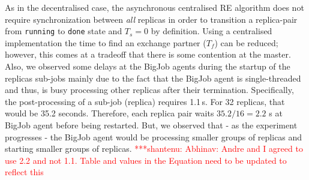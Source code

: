 \documentclass{rspublic}
\newcommand{\jhanote}[1]{ {\textcolor{red} { ***shantenu: #1 }}}
\newcommand{\alnote}[1]{ {\textcolor{blue} { ***andre: #1 }}}
\newcommand{\athotanote}[1]{ {\textcolor{green} { ***athota: #1 }}}
\newcommand{\alnote}[1]{}
\newcommand{\athotanote}[1]{}
\newcommand{\jhanote}[1]{}
\begin{document}




As in the decentralised case, the asynchronous centralised RE
algorithm does not require synchronization between {\it all} replicas
in order to transition a replica-pair from \texttt{running} to
\texttt{done} state and $T_s = 0$ by definition. Using a centralised
implementation the time to find an exchange partner ($T_f$) can be
reduced; however, this comes at a tradeoff that there is some
contention at the master. Also, we observed some delays at the BigJob
agents during the startup of the replicas sub-jobs mainly due to the
fact that the BigJob agent is single-threaded and thus, is busy
processing other replicas after their termination.  Specifically, the
post-processing of a sub-job (replica) requires
1.1\,s.%
For 32 replicas, that would be 35.2 seconds. Therefore, each replica
pair waits $35.2/16=2.2$ s at BigJob agent before being
restarted. But, we observed that - as the experiment progresses - the
BigJob agent would be processing smaller groups of replicas and
starting smaller groups of replicas. \jhanote{Abhinav: Andre and I
  agreed to use 2.2 and not 1.1. Table and values in the Equation need
  to be updated to reflect this}
\end{document}
